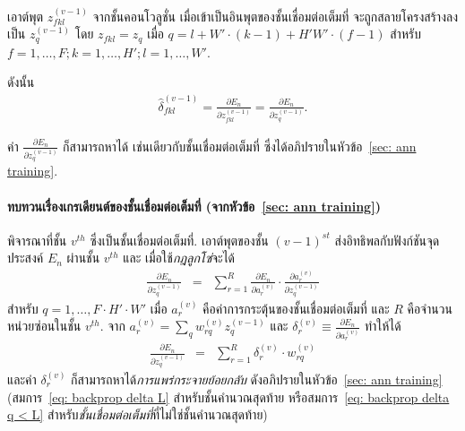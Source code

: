 เอาต์พุต $z_{fkl}^{(v-1)}$ จากชั้นคอนโวลูชั่น เมื่อเข้าเป็นอินพุตของชั้นเชื่อมต่อเต็มที่ จะถูกสลายโครงสร้างลงเป็น $z_q^{(v-1)}$
โดย
$z_{fkl} = z_q$ เมื่อ $q = l + W' \cdot (k - 1) + H' W' \cdot (f - 1)$
สำหรับ $f = 1, \ldots, F; k = 1, \ldots, H'; l = 1, \ldots, W'$.

ดังนั้น
\begin{eqnarray}
\hat{\delta}_{fkl}^{(v-1)} = \frac{\partial E_n}{\partial z_{fkl}^{(v-1)}}
= 
\frac{\partial E_n}{\partial z_q^{(v-1)}}
\label{eq: deep conv grad delta hat FC next 1} .
\end{eqnarray}


ค่า $\frac{\partial E_n}{\partial z_q^{(v-1)}}$
ก็สามารถหาได้ เช่นเดียวกับชั้นเชื่อมต่อเต็มที่ ซึ่งได้อภิปรายในหัวข้อ~\ref{sec: ann training}.

{\small
	\begin{shaded}
		\paragraph{\small ทบทวนเรื่องเกรเดียนต์ของชั้นเชื่อมต่อเต็มที่ (จากหัวข้อ~\ref{sec: ann training})}
		พิจารณาที่ชั้น $v^{th}$ ซึ่งเป็นชั้นเชื่อมต่อเต็มที่.
		เอาต์พุตของชั้น $(v-1)^{st}$ ส่งอิทธิพลกับฟังก์ชันจุดประสงค์ $E_n$ ผ่านชั้น $v^{th}$
		และ เมื่อใช้\textit{กฎลูกโซ่}จะได้
		\begin{eqnarray}
		\frac{\partial E_n}{\partial z_q^{(v-1)}}
		&=& \sum_{r=1}^R \frac{\partial E_n}{\partial a_r^{(v)}}
		\cdot
		\frac{\partial a_r^{(v)}}{\partial z_q^{(v-1)}}
		\nonumber
		\end{eqnarray}
		สำหรับ $q = 1, \ldots, F \cdot H' \cdot W'$
		เมื่อ $a_r^{(v)}$ คือค่าการกระตุ้นของชั้นเชื่อมต่อเต็มที่
		และ $R$ คือจำนวนหน่วยซ่อนในชั้น $v^{th}$.
		จาก $a_r^{(v)} = \sum_q w_{rq}^{(v)} z_q^{(v-1)}$ และ $\delta_r^{(v)} \equiv \frac{\partial E_n}{\partial a_r^{(v)}}$ ทำให้ได้
		\begin{eqnarray}
		\frac{\partial E_n}{\partial z_q^{(v-1)}}
		&=& \sum_{r=1}^R \delta_r^{(v)}
		\cdot
		w_{rq}^{(v)}
		\nonumber 
		\end{eqnarray}
		และค่า $\delta_r^{(v)}$ ก็สามารถหาได้\textit{การแพร่กระจายย้อยกลับ} ดังอภิปรายในหัวข้อ~\ref{sec: ann training} (สมการ~\ref{eq: backprop delta L} สำหรับชั้นคำนวณสุดท้าย 
		หรือสมการ~\ref{eq: backprop delta q < L} สำหรับ\textit{ชั้นเชื่อมต่อเต็มที่}ที่ไม่ใช่ชั้นคำนวณสุดท้าย)
		
	\end{shaded}
}%



